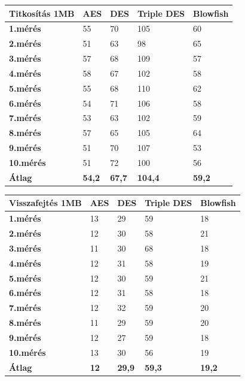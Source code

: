 \newpage
\begin{center}
	\begin{tabular}{|p{2.4cm}|p{2cm}|p{2cm}|p{2cm}|p{2cm}|}
		\hline
		\textbf{Titkosítás} \newline \textbf{1MB} & \textbf{AES} & \textbf{DES} & \textbf{Triple DES} & \textbf{Blowfish}\\
		\hline
		\textbf{1.mérés} & 55 & 70 & 105 & 60\\
		\hline
		\textbf{2.mérés} & 51 & 63 & 98 & 65\\
		\hline
		\textbf{3.mérés} & 57 & 68 & 109 & 57\\
		\hline
		\textbf{4.mérés} & 58 & 67 & 102 & 58\\
		\hline
		\textbf{5.mérés} & 55 & 68 & 110 & 62\\
		\hline
		\textbf{6.mérés} & 54 & 71 & 106 & 58\\
		\hline
		\textbf{7.mérés} & 53 & 63 & 102 & 59\\
		\hline
		\textbf{8.mérés} & 57 & 65 & 105 & 64\\
		\hline
		\textbf{9.mérés} & 51 & 70 & 107 & 53\\
		\hline
		\textbf{10.mérés} & 51 & 72 & 100 & 56\\
		\hline
		\hline
		\textbf{Átlag} & \textbf{54,2} & \textbf{67,7} &\textbf{ 104,4} & \textbf{59,2}\\
		\hline
	\end{tabular}
\end{center}

\begin{center}
	\begin{tabular}{|p{2.4cm}|p{2cm}|p{2cm}|p{2cm}|p{2cm}|}
		\hline
		\textbf{Visszafejtés} \newline \textbf{1MB} & \textbf{AES} & \textbf{DES} & \textbf{Triple DES} & \textbf{Blowfish}\\
		\hline
		\textbf{1.mérés} & 13 & 29 & 59 & 18\\
		\hline
		\textbf{2.mérés} & 12 & 30 & 58 & 21\\
		\hline
		\textbf{3.mérés} & 11 & 30 & 68 & 18\\
		\hline
		\textbf{4.mérés} & 12 & 31 & 58 & 19\\
		\hline
		\textbf{5.mérés} & 12 & 30 & 59 & 21\\
		\hline
		\textbf{6.mérés} & 12 & 31 & 58 & 18\\
		\hline
		\textbf{7.mérés} & 12 & 32 & 59 & 20\\
		\hline
		\textbf{8.mérés} & 11 & 29 & 59 & 20\\
		\hline
		\textbf{9.mérés} & 12 & 27 & 59 & 18\\
		\hline
		\textbf{10.mérés} & 13 & 30 & 56 & 19\\
		\hline
		\hline
		\textbf{Átlag} & \textbf{12} & \textbf{29,9} & \textbf{59,3} & \textbf{19,2}\\
		\hline
	\end{tabular}
\end{center}

